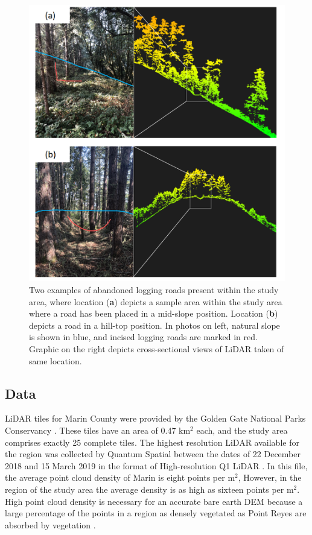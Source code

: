 \documentclass[remotesensing,article,accept,pdftex,moreauthors]{Definitions/mdpi}
\begin{document}
\begin{figure}[H]	
\includegraphics[width=10 cm]{roadtypes.png}
\caption{Two examples of abandoned logging roads present within the study area, where location (\textbf{a}) depicts a sample area within the study area where a road has been placed in a mid-slope position. Location (\textbf{b}) depicts a road in a hill-top position. In photos on left, natural slope is shown in blue, and incised logging roads are marked in red. Graphic on the right depicts cross-sectional views of LiDAR taken of same location.\label{fig2}}
\end{figure}  

\subsection{Data}

LiDAR tiles for Marin County were provided by the Golden Gate National Parks Conservancy \cite{becker}. These tiles have an area of 0.47 km$^2$ each, and the study area comprises exactly 25 complete tiles. The highest resolution LiDAR available for the region was collected by Quantum Spatial between the dates of 22 December 2018 and 15 March 2019 in the format of High-resolution Q1 LiDAR \cite{quantum}. In this file, the average point cloud density of Marin is eight points per m$^2$, However, in the region of the study area the average density is as high as sixteen points per m$^2$. High point cloud density is necessary for an accurate bare earth DEM because a large percentage of the points in a region as densely vegetated as Point Reyes \cite{sherba, white} are absorbed by vegetation %
.
\end{document}
